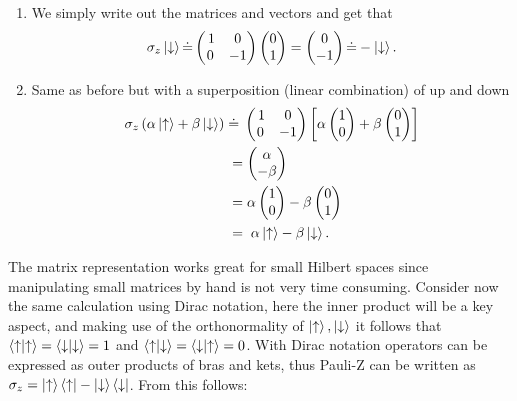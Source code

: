 \begin{enumerate}[label = \textbf{\alph*)}]
\item We simply write out the matrices and vectors and get that
\begin{equation}
\sigma_z\ket{\downarrow} \dot{=} \begin{pmatrix}
\,1 & 0 \\
0 & -1 \\
\end{pmatrix}\begin{pmatrix}
0 \\ 1
\end{pmatrix} = \begin{pmatrix}
0 \\ -1
\end{pmatrix} \dot{=} -\ket{\downarrow}.
\end{equation}

\item Same as before but with a superposition (linear combination) of up and down 
\begin{equation}
\begin{aligned}
\sigma_z\left(\alpha\ket{\uparrow} + \beta\ket{\downarrow} \right) \; &\dot{=} \;\begin{pmatrix}
\,1 & 0 \\
0 & -1 \\
\end{pmatrix}\left[\alpha\begin{pmatrix}
1 \\ 0
\end{pmatrix} + \beta\begin{pmatrix}
0 \\ 1
\end{pmatrix} \right] \\ &= \begin{pmatrix}
\alpha \\ -\beta
\end{pmatrix}  \\&= \alpha\begin{pmatrix}
1 \\ 0
\end{pmatrix} -\beta\begin{pmatrix}
0 \\ 1
\end{pmatrix} \\&= \;\alpha\ket{\uparrow} - \beta\ket{\downarrow}.
\end{aligned}
\end{equation}
\end{enumerate}
The matrix representation works great for small Hilbert spaces since manipulating small matrices by hand is not very time consuming. Consider now the same calculation using Dirac notation, here the inner product will be a key aspect, and making use of the orthonormality of $\ket{\uparrow},\ket{\downarrow}$ it follows that $\bra{\uparrow}\ket{\uparrow} = \bra{\downarrow}\ket{\downarrow} = 1$ and $\bra{\uparrow}\ket{\downarrow} = \bra{\downarrow}\ket{\uparrow} = 0$.
With Dirac notation operators can be expressed as outer products of bras and kets, thus Pauli-Z can be written as $\sigma_z = \ket{\uparrow}\bra{\uparrow} - \ket{\downarrow}\bra{\downarrow}$. From this follows:

